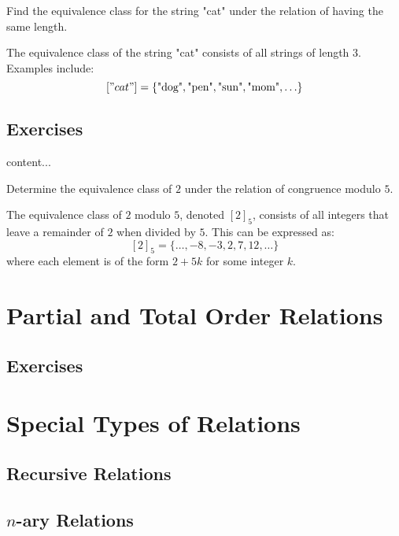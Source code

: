 \begin{example}
	Find the equivalence class for the string "cat" under the relation of having the same length.
\end{example}

\begin{solution}
	The equivalence class of the string "cat" consists of all strings of length 3. Examples include:
	\[ ["cat"] = \{ \text{"dog"}, \text{"pen"}, \text{"sun"}, \text{"mom"}, \ldots \} \]
\end{solution}
\subsection{Exercises}

\begin{exercise}
	content...
\end{exercise}
\begin{exercise}
		Determine the equivalence class of \( 2 \) under the relation of congruence modulo \( 5 \).
\end{exercise}
	\begin{solution}
		The equivalence class of \( 2 \) modulo \( 5 \), denoted \( [2]_5 \), consists of all integers that leave a remainder of \( 2 \) when divided by \( 5 \). This can be expressed as:
		\[ [2]_5 = \{ \ldots, -8, -3, 2, 7, 12, \ldots \} \]
		where each element is of the form \( 2 + 5k \) for some integer \( k \).
	\end{solution}



\section{Partial and Total Order Relations}



\subsection{Exercises}
\section{Special Types of Relations}
\subsection{Recursive Relations}
\subsection{\(n\)-ary Relations}

